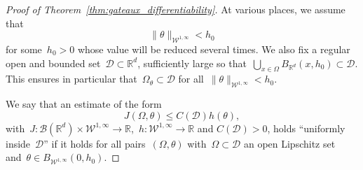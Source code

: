 \documentclass[a4]{article}
\newcommand{\R}{\mathbb{R}}
\newcommand{\1}{\mathbbm 1}
\newcommand{\Winf}{{{\cW}^{1,\infty}}}
\newcommand{\cW}{\mathcal{W}}
\begin{document}
\begin{proof}[Proof of Theorem~\ref{thm:gateaux_differentiability}]
    At various places, we assume that
    $$\|\theta\|_{\Winf} < h_0$$
    for some~$h_0>0$ whose value will be reduced several times.
    We also fix a regular open and bounded set~$\mathcal D\subset\R^d$, sufficiently large so that~$\bigcup_{x\in \Omega} B_{\R^d}(x,h_0)\subset \mathcal D$. This ensures in particular that~$\Omega_\theta\subset \mathcal D$ for all~$\|\theta\|_{\Winf}< h_0$.

    We say that an estimate of the form
    \begin{equation}
        J(\Omega,\theta) \leq C(\mathcal D)h(\theta),
    \end{equation}
    with~$J : \mathcal B(\R^d)\times \Winf \to \R$,~$h:\Winf\to\R$ and $C(\mathcal D)>0$, holds ``uniformly inside~$\mathcal D$'' if it holds for all pairs~$(\Omega,\theta)$ with~$\Omega\subset \mathcal D$ an open Lipschitz set and~$\theta\in B_{\Winf}(0,h_0)$.


\end{proof}
\end{document}
